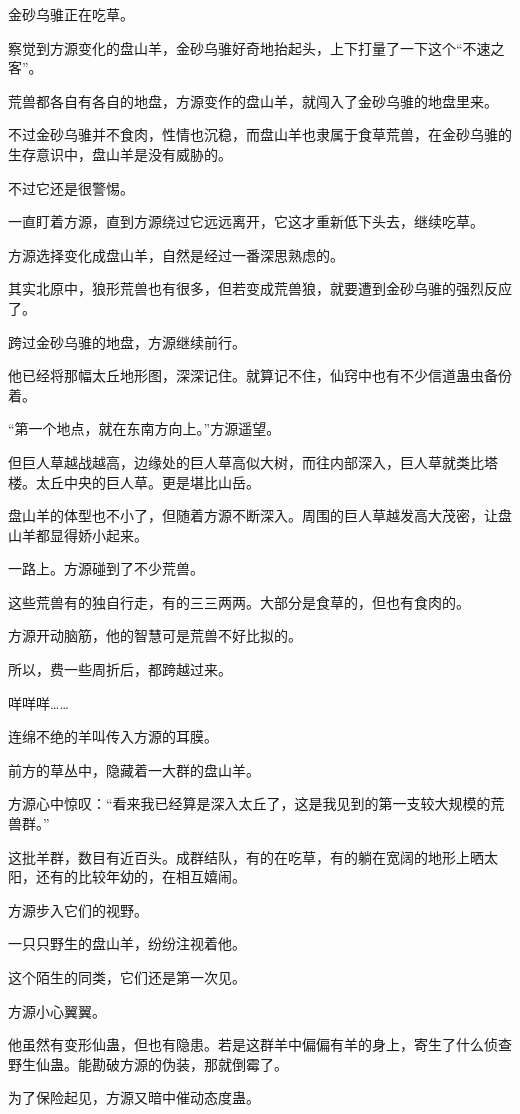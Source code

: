 \begin{this_body}
金砂乌骓正在吃草。

察觉到方源变化的盘山羊，金砂乌骓好奇地抬起头，上下打量了一下这个“不速之客”。

荒兽都各自有各自的地盘，方源变作的盘山羊，就闯入了金砂乌骓的地盘里来。

不过金砂乌骓并不食肉，性情也沉稳，而盘山羊也隶属于食草荒兽，在金砂乌骓的生存意识中，盘山羊是没有威胁的。

不过它还是很警惕。

一直盯着方源，直到方源绕过它远远离开，它这才重新低下头去，继续吃草。

方源选择变化成盘山羊，自然是经过一番深思熟虑的。

其实北原中，狼形荒兽也有很多，但若变成荒兽狼，就要遭到金砂乌骓的强烈反应了。

跨过金砂乌骓的地盘，方源继续前行。

他已经将那幅太丘地形图，深深记住。就算记不住，仙窍中也有不少信道蛊虫备份着。

“第一个地点，就在东南方向上。”方源遥望。

但巨人草越战越高，边缘处的巨人草高似大树，而往内部深入，巨人草就类比塔楼。太丘中央的巨人草。更是堪比山岳。

盘山羊的体型也不小了，但随着方源不断深入。周围的巨人草越发高大茂密，让盘山羊都显得娇小起来。

一路上。方源碰到了不少荒兽。

这些荒兽有的独自行走，有的三三两两。大部分是食草的，但也有食肉的。

方源开动脑筋，他的智慧可是荒兽不好比拟的。

所以，费一些周折后，都跨越过来。

咩咩咩……

连绵不绝的羊叫传入方源的耳膜。

前方的草丛中，隐藏着一大群的盘山羊。

方源心中惊叹：“看来我已经算是深入太丘了，这是我见到的第一支较大规模的荒兽群。”

这批羊群，数目有近百头。成群结队，有的在吃草，有的躺在宽阔的地形上晒太阳，还有的比较年幼的，在相互嬉闹。

方源步入它们的视野。

一只只野生的盘山羊，纷纷注视着他。

这个陌生的同类，它们还是第一次见。

方源小心翼翼。

他虽然有变形仙蛊，但也有隐患。若是这群羊中偏偏有羊的身上，寄生了什么侦查野生仙蛊。能勘破方源的伪装，那就倒霉了。

为了保险起见，方源又暗中催动态度蛊。


\end{this_body}
